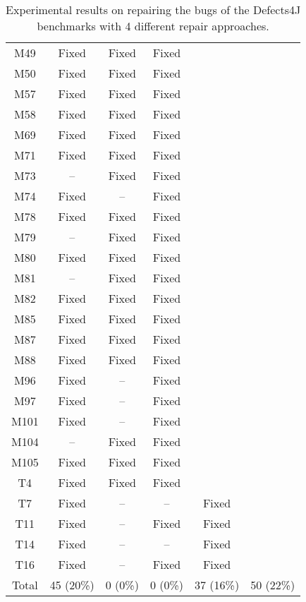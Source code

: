 \begin{table}[!t]
{\begin{tabular}{|c|c|c|c|c|c|}
M49               & Fixed     & Fixed     &Fixed   \\
M50               & Fixed     & Fixed     &Fixed   \\
M57               & Fixed     & Fixed     &Fixed   \\
M58               & Fixed     & Fixed     &Fixed   \\
M69               & Fixed     & Fixed     &Fixed   \\
M71               & Fixed     & Fixed     &Fixed   \\
M73               & --        & Fixed     &Fixed   \\
M74               & Fixed     & --        &Fixed   \\
M78               & Fixed     & Fixed     &Fixed   \\
M79               & --        & Fixed     &Fixed   \\
M80               & Fixed     & Fixed     &Fixed   \\
M81               & --        & Fixed     &Fixed   \\
M82               & Fixed     & Fixed     &Fixed   \\
M85               & Fixed     & Fixed     &Fixed   \\
M87               & Fixed     & Fixed     &Fixed   \\
M88               & Fixed     & Fixed     &Fixed   \\
M96               & Fixed     & --        &Fixed   \\
M97               & Fixed     & --        &Fixed   \\
M101              & Fixed     & --        &Fixed   \\
M104              & --        & Fixed     &Fixed   \\
M105              & Fixed     & Fixed     &Fixed   \\
\hline
T4                & Fixed     & Fixed     &Fixed   \\
T7                & Fixed     & --        & --        &Fixed   \\
T11               & Fixed     & --        & Fixed     &Fixed   \\
T14               & Fixed     & --        & --        &Fixed   \\
T16               & Fixed     & --        & Fixed     &Fixed   \\
\hline
Total             & 45 (20\%) & 0 (0\%)   & 0 (0\%)   & 37 (16\%) & 50 (22\%)\\
\hline 
\end{tabular}%
}
\caption{Experimental results on repairing the bugs of the Defects4J benchmarks with 4 different repair approaches.}
\end{table}
